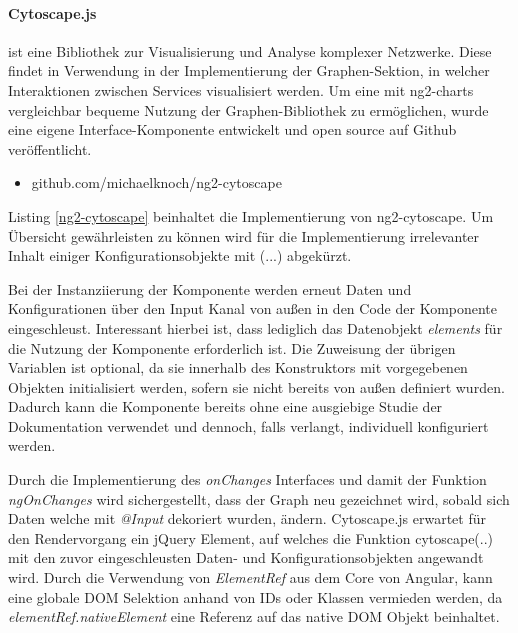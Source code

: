 \paragraph{Cytoscape.js}
ist eine Bibliothek zur Visualisierung und Analyse komplexer Netzwerke.
Diese findet in \projectname{} Verwendung in der Implementierung der Graphen-Sektion,
in welcher Interaktionen zwischen Services visualisiert werden.
Um eine mit ng2-charts vergleichbar bequeme Nutzung der Graphen-Bibliothek zu ermöglichen,
wurde eine eigene Interface-Komponente entwickelt und open source auf Github veröffentlicht.

\begin{itemize}
  \item{github.com/michaelknoch/ng2-cytoscape}
\end{itemize}



\noindent Listing \ref{ng2-cytoscape} beinhaltet die Implementierung von ng2-cytoscape.
Um Übersicht gewährleisten zu können wird für die Implementierung irrelevanter Inhalt einiger Konfigurationsobjekte mit (...) abgekürzt.

Bei der Instanziierung der Komponente werden erneut Daten und Konfigurationen über den Input Kanal von außen
in den Code der Komponente eingeschleust. Interessant hierbei ist,
dass lediglich das Datenobjekt \emph{elements} für die Nutzung der Komponente erforderlich ist.
Die Zuweisung der übrigen Variablen ist optional, da sie innerhalb des Konstruktors mit vorgegebenen Objekten initialisiert werden, sofern sie nicht bereits von außen definiert wurden.
Dadurch kann die Komponente bereits ohne eine ausgiebige Studie der Dokumentation verwendet und dennoch, falls verlangt, individuell konfiguriert werden.

Durch die Implementierung des \emph{onChanges} Interfaces und damit der Funktion \emph{ngOnChanges} wird sichergestellt,
dass der Graph neu gezeichnet wird, sobald sich Daten welche mit \emph{@Input} dekoriert wurden, ändern.
Cytoscape.js erwartet für den Rendervorgang ein jQuery Element, auf welches die Funktion cytoscape({..})
mit den zuvor eingeschleusten Daten- und Konfigurationsobjekten angewandt wird.
Durch die Verwendung von \emph{ElementRef} aus dem Core von Angular, kann eine globale \ac{DOM} Selektion anhand von IDs oder Klassen vermieden werden, da \emph{elementRef.nativeElement} eine Referenz auf das native \ac{DOM} Objekt beinhaltet.

